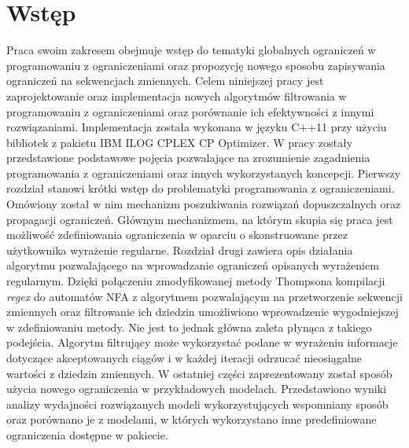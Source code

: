 \chapter{Wstęp}
\thispagestyle{chapterBeginStyle}


\par
Praca swoim zakresem obejmuje wstęp do tematyki globalnych ograniczeń w programowaniu z ograniczeniami oraz propozycję
nowego sposobu zapisywania ograniczeń na sekwencjach zmiennych. Celem niniejszej pracy jest zaprojektowanie oraz implementacja
nowych algorytmów filtrowania w programowaniu z ograniczeniami oraz porównanie ich efektywności z innymi rozwiązaniami. 
Implementacja została wykonana w języku C++11 przy użyciu bibliotek z pakietu IBM ILOG CPLEX CP Optimizer. W pracy zostały 
przedstawione podstawowe pojęcia pozwalające na zrozumienie zagadnienia programowania z ograniczeniami oraz innych
wykorzystanych koncepcji. Pierwszy rozdział stanowi krótki wstęp do problematyki programowania z ograniczeniami.
Omówiony został w nim mechanizm poszukiwania rozwiązań dopuszczalnych oraz propagacji ograniczeń. Głównym mechanizmem,
na którym skupia się praca jest możliwość zdefiniowania ograniczenia w oparciu o skonstruowane przez użytkownika
wyrażenie regularne. Rozdział drugi zawiera opis działania algorytmu pozwalającego na wprowadzanie ograniczeń opisanych
wyrażeniem regularnym. Dzięki połączeniu zmodyfikowanej metody Thompsona kompilacji \textit{regex} do automatów NFA z algorytmem
pozwalającym na przetworzenie sekwencji zmiennych oraz filtrowanie ich dziedzin umożliwiono wprowadzenie wygodniejszej
w zdefiniowaniu metody. Nie jest to jednak główna zaleta płynąca z takiego podejścia. Algorytm filtrujący może wykorzystać
podane w wyrażeniu informacje dotyczące akceptowanych ciągów i w każdej iteracji odrzucać nieosiągalne wartości z dziedzin
zmiennych. W ostatniej części zaprezentowany został sposób użycia nowego ograniczenia w przykładowych modelach. Przedstawiono wyniki
analizy wydajności rozwiązanych modeli wykorzystujących wspomniany sposób oraz porównano je z modelami, w których
wykorzystano inne predefiniowane ograniczenia dostępne w pakiecie.
